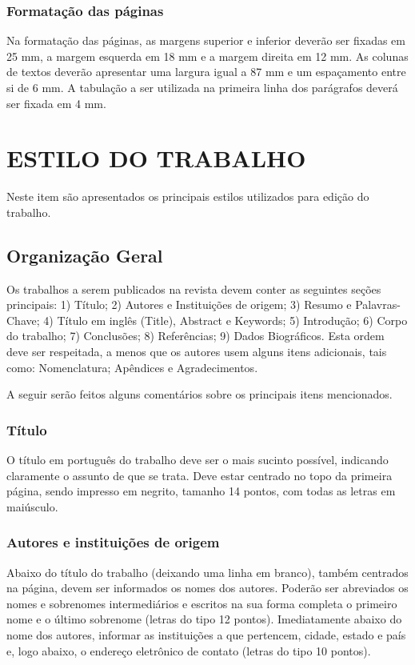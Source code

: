\subsubsection{Formatação das páginas}

Na formatação das páginas, as margens superior e inferior deverão ser fixadas em 25 mm, a margem esquerda em 18 mm e a margem direita em 12 mm. As colunas de textos deverão apresentar uma largura igual a 87 mm e um espaçamento entre si de 6 mm. A tabulação a ser utilizada na primeira linha dos parágrafos deverá ser fixada em 4 mm.

\section{ESTILO DO TRABALHO}

Neste item são apresentados os principais estilos utilizados para edição do trabalho.

\subsection{Organização Geral}

Os trabalhos a serem publicados na revista devem conter as seguintes seções principais: 1) Título; 2) Autores e Instituições de origem; 3) Resumo e Palavras-Chave; 4) Título em inglês (Title), Abstract e Keywords; 5) Introdução; 6) Corpo do trabalho; 7) Conclusões; 8) Referências; 9) Dados Biográficos. Esta ordem deve ser respeitada, a menos que os autores usem alguns itens adicionais, tais como: Nomenclatura; Apêndices e Agradecimentos.

A seguir serão feitos alguns comentários sobre os principais itens mencionados.

\subsubsection{Título}
O título em português do trabalho deve ser o mais sucinto possível, indicando claramente o assunto de que se trata. Deve estar centrado no topo da primeira página, sendo impresso em negrito, tamanho 14 pontos, com todas as letras em maiúsculo.

\subsubsection{Autores e instituições de origem} 
Abaixo do título do trabalho (deixando uma linha em branco), também centrados na página, devem ser informados os nomes dos autores. Poderão ser abreviados os nomes e sobrenomes intermediários e escritos na sua forma completa o primeiro nome e o último sobrenome (letras do tipo 12 pontos). Imediatamente abaixo do nome dos autores, informar as instituições a que pertencem, cidade, estado e país e, logo abaixo, o endereço eletrônico de contato (letras do tipo 10 pontos).

